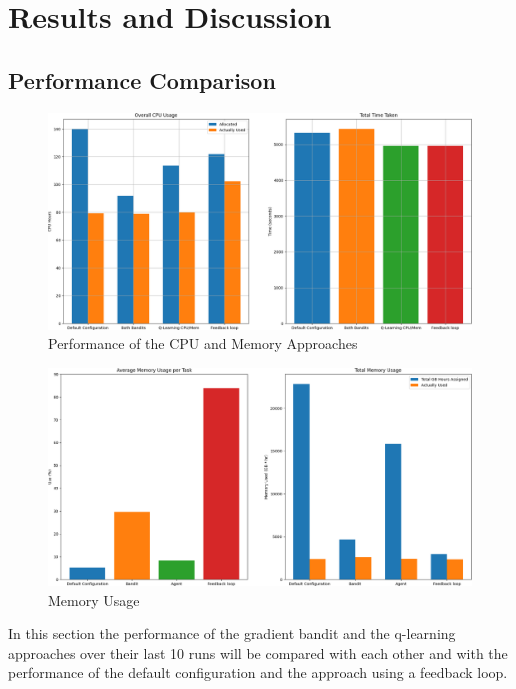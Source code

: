 \section{Results and Discussion}
\label{sec:analysis}

\subsection{Performance Comparison}
\label{sub:comp_perf}

\begin{figure}[h]
    \centering
        \includegraphics[width=\textwidth]{fig/cpu_mem_results.png}
        \caption{Performance of the CPU and Memory Approaches}
        \label{fig:cpu_results}
\end{figure}

\begin{figure}[ht]
    \centering
        \includegraphics[width=\textwidth]{fig/cropped_memory_usage_final.png}
        \caption{Memory Usage}
        \label{fig:mem_use}
\end{figure}

In this section the performance of the gradient bandit and the q-learning approaches over their last 10 runs will be compared with each other and with the performance of the default configuration and the approach using a feedback loop.

